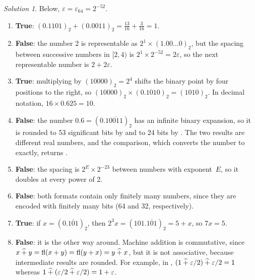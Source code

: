 \documentclass[10pt]{article}
\theoremstyle{definition}
\theoremstyle{remark}
\newtheorem*{protosolution}{Solution}
\newenvironment{solutionframe}
{%
    \begin{mdframed}[
        leftmargin=1cm,
        skipabove=.3cm,
        linecolor=blue,
        backgroundcolor=lightgreen,
        linewidth=0pt,
        innerleftmargin=.5em,
        innerrightmargin=.5em,
        innertopmargin=.3em,
        innerbottommargin=.6em,
    ]
}
{
    \end{mdframed}
}
\newenvironment{solution}
{\pushQED{\qed}\renewcommand{\qedsymbol}{$\triangle$}
\begin{solutionframe}\small \begin{protosolution}}
{\popQED\end{protosolution}\end{solutionframe}}
\begin{document}
\begin{solution}
    Below, $\varepsilon = \varepsilon_{64} = 2^{-52}$.
    \begin{enumerate}
        \item \textbf{True}:
            $(0.1101)_2 + (0.0011)_2 = \frac{13}{16} + \frac{3}{16} = 1$.

        \item \textbf{False}:
            the number 2 is representable as $2^1 \times (1.00\dots0)_2$,
            but the spacing between successive  numbers in $[2, 4)$ is $2^1 \times 2^{-52} = 2 \varepsilon$,
            so the next representable number is $2 + 2\varepsilon$.

        \item \textbf{True}:
            multiplying by $(10000)_2 = 2^4$ shifts the binary point by four positions to the right,
            so $(10000)_2 \times (0.1010)_2 = (1010)_2$.
            In decimal notation, $16 \times 0.625 = 10$.

        \item \textbf{False}:
            the number $0.6 = (0.1\overline{0011})_2$ has an infinite binary expansion,
            so it is rounded to 53 significant bits by  and to 24 bits by .
            The two results are different real numbers,
            and the comparison, which converts the  number to  exactly, returns .

        \item \textbf{False}:
            the spacing is $2^{E} \times 2^{-23}$ between numbers with exponent~$E$,
            so it doubles at every power of 2.

        \item \textbf{False}:
            both formats contain only finitely many numbers,
            since they are encoded with finitely many bits (64 and 32, respectively).

        \item \textbf{True}:
            if $x = (0.\overline{101})_2$, then $2^3 x = (101.\overline{101})_2 = 5 + x$,
            so $7x = 5$.

        \item \textbf{False}:
            it is the other way around.
            Machine addition is commutative,
            since $x \mathbin{\widehat +} y = \operatorname{fl}(x + y) = \operatorname{fl}(y + x) = y \mathbin{\widehat +} x$,
            but it is not associative, because intermediate results are rounded.
            For example, in ,
            $(1 \mathbin{\widehat +} \varepsilon/2) \mathbin{\widehat +} \varepsilon/2 = 1$ whereas $1 \mathbin{\widehat +} (\varepsilon/2 \mathbin{\widehat +} \varepsilon/2) = 1 + \varepsilon$.


\end{enumerate}
\end{solution}
\end{document}
